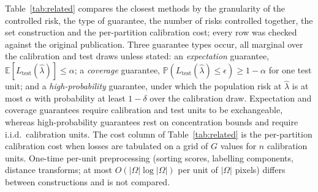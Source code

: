 \documentclass[sn-mathphys-num]{sn-jnl}%
\theoremstyle{thmstyleone}
\theoremstyle{thmstyletwo}
\theoremstyle{thmstylethree}
\newcommand{\E}{\mathbb{E}}
\newcommand{\Prob}{\mathbb{P}}
\newcommand{\1}{\mathbb{1}}
\begin{document}
Table~\ref{tab:related} compares the closest methods by the granularity of the controlled risk, the type of guarantee, the number of risks controlled together, the set construction and the per-partition calibration cost; every row was checked against the original publication. Three guarantee types occur, all marginal over the calibration and test draws unless stated: an \emph{expectation} guarantee, $\E[L_{\mathrm{test}}(\hat\lambda)]\le\alpha$; a \emph{coverage} guarantee, $\Prob(L_{\mathrm{test}}(\hat\lambda)\le\epsilon)\ge1-\alpha$ for one test unit; and a \emph{high-probability} guarantee, under which the population risk at $\hat\lambda$ is at most $\alpha$ with probability at least $1-\delta$ over the calibration draw. Expectation and coverage guarantees require calibration and test units to be exchangeable, whereas high-probability guarantees rest on concentration bounds and require i.i.d.\ calibration units. The cost column of Table~\ref{tab:related} is the per-partition calibration cost when losses are tabulated on a grid of $G$ values for $n$ calibration units. One-time per-unit preprocessing (sorting scores, labelling components, distance transforms; at most $O(|\Omega|\log|\Omega|)$ per unit of $|\Omega|$ pixels) differs between constructions and is not compared.
\end{document}

